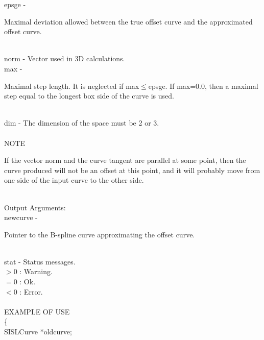         \>\>    {\fov epsge}    \> - \> \begin{minipg2}
                        Maximal deviation allowed between the true offset
                        curve and the approximated offset curve.
                                \end{minipg2}\\[0.3ex]
        \>\>    {\fov norm}     \> - \> Vector used in 3D calculations.\\
        \>\>    {\fov max}      \> - \> \begin{minipg2}
                        Maximal step length. It is neglected if
                        max$\leq$epsge. If max=0.0, then a maximal step
                        equal to the longest box side of the curve is used.
                                \end{minipg2}\\[0.8ex]
        \>\>    {\fov dim}      \> - \>The dimension of the space must be 2 or 3.\\
\\
NOTE\\
\>\begin{minipg6}
  If the vector norm and the curve tangent are parallel at some point,
  then the curve produced will not be an offset at this point, and it
  will probably move from one side of the input curve to the other side.
\end{minipg6}\\
\newpagetabs
        \>Output Arguments:\\
        \>\>    {\fov newcurve}\> - \> \begin{minipg2}
                        Pointer to the B-spline curve
                        approximating the offset curve.
                                       \end{minipg2}\\[0.8ex]
        \>\>    {\fov stat}     \> - \> Status messages.\\
                \>\>\>\>\>              $> 0$   : Warning.\\
                \>\>\>\>\>              $= 0$   : Ok.\\
                \>\>\>\>\>              $< 0$   : Error.\\
\\
EXAMPLE OF USE\\
                \>      \{ \\
                \>\>    SISLCurve       \>      *{\fov oldcurve};\\
